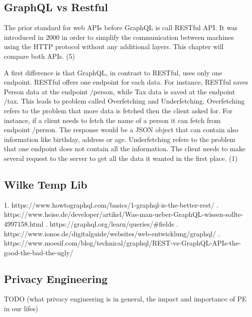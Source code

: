 \documentclass[conference]{IEEEtran}
\begin{document}
\subsection{GraphQL vs Restful}\label{graphql}

The prior standard for web APIs before GraphQL is call RESTful API. It was introduced in 2000 in order to simplify the communication between machines using the HTTP protocol without any additional layers. This chapter will compare both APIs. (5)

A first difference is that GraphQL, in contrast to RESTful, uses only one endpoint. RESTful offers one endpoint for each data. For instance, RESTful saves Person data at the endpoint /person, while Tax data is saved at the endpoint /tax. This leads to problem called Overfetching and Underfetching. Overfetching refers to the problem that more data is fetched then the client asked for. For instance, if a client needs to fetch the name of a person it can fetch from endpoint /person. The response would be a JSON object that can contain also information like birthday, address or age. Underfetching refers to the problem that one endpoint does not contain all the information. The client needs to make several request to the server to get all the data it wanted in the first place. (1)

\subsection{Wilke Temp Lib}\label{graphql}

1.	https://www.howtographql.com/basics/1-graphql-is-the-better-rest/ .	https://www.heise.de/developer/artikel/Was-man-ueber-GraphQL-wissen-sollte-4997158.html .	https://graphql.org/learn/queries/#fields .	https://www.ionos.de/digitalguide/websites/web-entwicklung/graphql/ .	https://www.moesif.com/blog/technical/graphql/REST-vs-GraphQL-APIs-the-good-the-bad-the-ugly/ \newline 


\subsection{Privacy Engineering}\label{privacy}

TODO (what privacy engineering is in general, the impact and importance of PE in our lifes)
\end{document}
